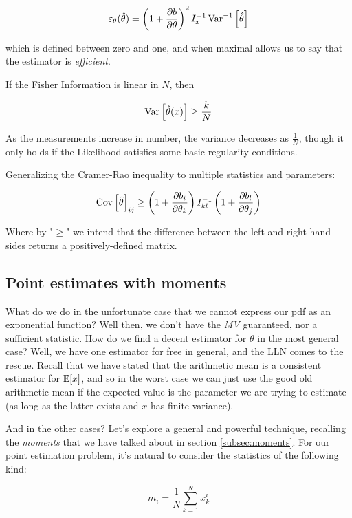 	\[
	\varepsilon_{\theta}(\hat\theta) = \left(1+\frac{\partial b}{\partial \theta}\right)^2 I_x^{-1}\operatorname{Var}^{-1}\left[\hat\theta\right]
	\]

which is defined between zero and one, and when maximal allows us to say that the estimator is \emph{efficient}.

\begin{corollary}
	If the Fisher Information is linear in $N$, then
	
	\[
	\operatorname{Var}\left[\hat\theta(x)\right] \geq \frac{k}{N}
	\]
	
	As the measurements increase in number, the variance decreases as $\frac{1}{N}$, though it only holds if the Likelihood satisfies some basic regularity conditions.
\end{corollary}

Generalizing the Cramer-Rao inequality to multiple statistics and parameters:

	\[
	\operatorname{Cov}\left[\hat\theta\right]_{ij}\geq\left(1+\frac{\partial b_i}{\partial \theta_k}\right)I^{-1}_{kl}\left(1+\frac{\partial b_l}{\partial \theta_j}\right)
	\]
	
Where by "$\geq$" we intend that the difference between the left and right hand sides returns a positively-defined matrix.

\subsection{Point estimates with moments}

What do we do in the unfortunate case that we cannot express our pdf as an exponential function? Well then, we don't have the \emph{MV} guaranteed, nor a sufficient statistic. How do we find a decent estimator for $\theta$ in the most general case? Well, we have one estimator for free in general, and the LLN comes to the rescue. Recall that we have stated that the arithmetic mean is a consistent estimator for $\mathbb{E}[x]$, and so in the worst case we can just use the good old arithmetic mean if the expected value is the parameter we are trying to estimate (as long as the latter exists and $x$ has finite variance). 

And in the other cases? Let's explore a general and powerful technique, recalling the \emph{moments} that we have talked about in section \ref{subsec:moments}. For our point estimation problem, it's natural to consider the statistics of the following kind:

	\[
	m_i = \frac{1}{N} \sum_{k=1}^{N}x_k^i
	\]
	
